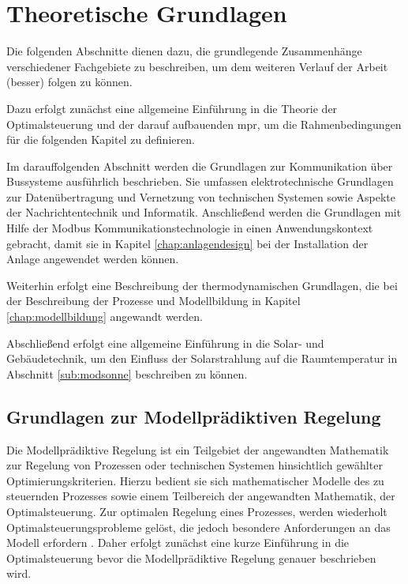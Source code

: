 \renewcommand{\chapterheadstartvskip}{\vspace*{2cm}}

\chapter{Theoretische Grundlagen}
\label{chap:theoretischegrundlagen}

Die folgenden Abschnitte dienen dazu, die grundlegende Zusammenhänge verschiedener Fachgebiete zu beschreiben, um dem weiteren Verlauf der Arbeit (besser) folgen zu können.

 Dazu erfolgt zunächst eine allgemeine Einführung in die Theorie der Optimalsteuerung und der darauf aufbauenden \acrlong{mpr}, um die Rahmenbedingungen für die folgenden Kapitel zu definieren. 
 
Im darauffolgenden Abschnitt werden die Grundlagen zur Kommunikation über Bussysteme ausführlich beschrieben. Sie umfassen elektrotechnische Grundlagen zur Datenübertragung und Vernetzung von technischen Systemen sowie Aspekte der Nachrichtentechnik und Informatik. Anschließend werden die Grundlagen mit Hilfe der Modbus Kommunikationstechnologie in einen Anwendungskontext gebracht, damit sie in Kapitel \ref{chap:anlagendesign} bei der Installation der Anlage angewendet werden können.

Weiterhin erfolgt eine Beschreibung der thermodynamischen Grundlagen, die bei der Beschreibung der Prozesse und Modellbildung in Kapitel \ref{chap:modellbildung} angewandt werden. 

Abschließend erfolgt eine allgemeine Einführung in die Solar- und Gebäudetechnik, um den Einfluss der Solarstrahlung auf die Raumtemperatur in Abschnitt \ref{sub:modsonne} beschreiben zu können.

\section{Grundlagen zur Modellprädiktiven Regelung}
\label{sec:mpc}

Die Modellprädiktive Regelung ist ein Teilgebiet der angewandten Mathematik zur Regelung von Prozessen oder technischen Systemen hinsichtlich gewählter Optimierungskriterien. Hierzu bedient sie sich mathematischer Modelle des zu steuernden Prozesses sowie einem Teilbereich der angewandten Mathematik, der Optimalsteuerung. Zur optimalen Regelung eines Prozesses, werden wiederholt Optimalsteuerungsprobleme gelöst, die jedoch besondere Anforderungen an das Modell erfordern \cite[S.~10]{di14}. Daher erfolgt zunächst eine kurze Einführung in die Optimalsteuerung bevor die Modellprädiktive Regelung genauer beschrieben wird.

